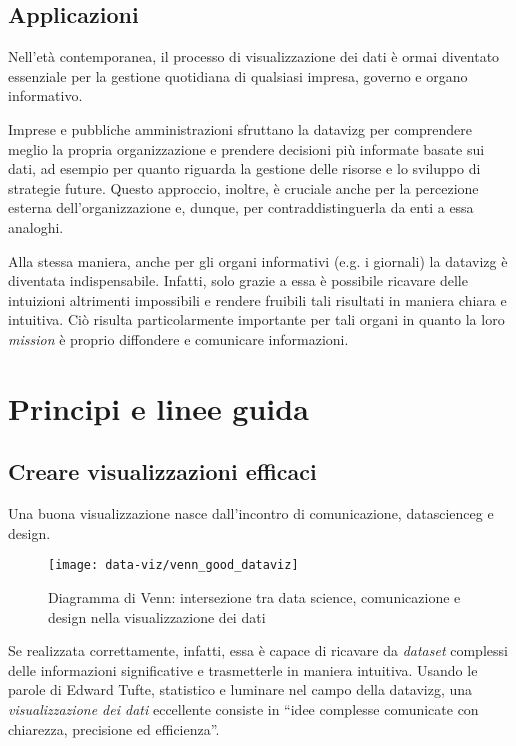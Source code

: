 \subsection{Applicazioni}
Nell'età contemporanea, il processo di visualizzazione dei dati è ormai diventato essenziale per la gestione quotidiana di qualsiasi 
impresa, governo e organo informativo.

Imprese e pubbliche amministrazioni sfruttano la \gls{datavizg} per comprendere meglio la propria organizzazione e 
prendere decisioni più informate basate sui dati, ad esempio per quanto riguarda la gestione delle risorse e lo sviluppo di strategie future. 
Questo approccio, inoltre, è cruciale anche per la percezione esterna dell'organizzazione e, dunque, per contraddistinguerla da enti a essa analoghi.

Alla stessa maniera, anche per gli organi informativi (e.g. i giornali) la \gls{datavizg} è diventata indispensabile. 
Infatti, solo grazie a essa è possibile ricavare delle intuizioni altrimenti impossibili e rendere fruibili 
tali risultati in maniera chiara e intuitiva. Ciò risulta particolarmente importante per tali organi in quanto la loro \emph{mission} è proprio diffondere 
e comunicare informazioni.



\section{Principi e linee guida}
\subsection{Creare visualizzazioni efficaci}
Una buona visualizzazione nasce dall'incontro di comunicazione, \gls{datascienceg} e design.
\begin{figure}[H] 
    \centering 
    \texttt{[image: data-viz/venn\_good\_dataviz]} 
    \caption{Diagramma di Venn: intersezione tra data science, comunicazione e design nella visualizzazione dei dati}
    \label{fig:venn_good_dataviz}
\end{figure}

\noindent Se realizzata correttamente, infatti, essa è capace di ricavare da \emph{dataset} complessi delle informazioni significative e trasmetterle in maniera intuitiva.
Usando le parole di Edward Tufte, statistico e luminare nel campo della \gls{datavizg}, una \emph{visualizzazione dei dati} eccellente consiste in
``idee complesse comunicate con chiarezza, precisione ed efficienza''.

